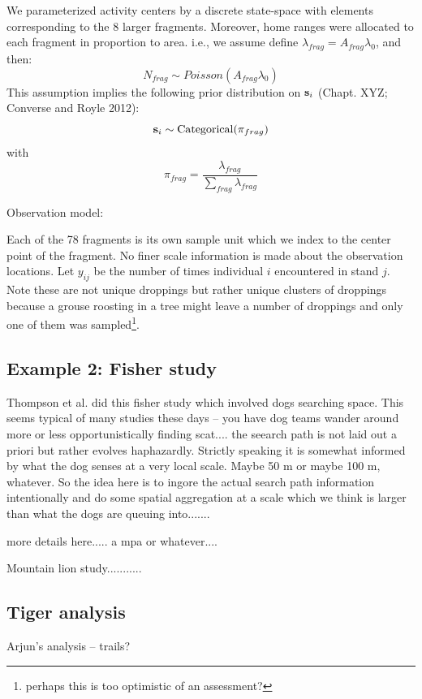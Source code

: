 We parameterized activity centers by a discrete state-space with elements
corresponding to the 8 larger fragments. Moreover, home ranges were allocated
to each fragment in  proportion to area. i.e., we assume
define $\lambda_{frag} = A_{frag} \lambda_{0}$, and then:
\[
 N_{frag} \sim Poisson( A_{frag} \lambda_{0} )
\]
This assumption implies the following prior distribution on ${\bf s}_{i}$ (Chapt.
XYZ; Converse and Royle 2012):
\[
{\bf s}_{i} \sim  \mbox{Categorical}(  \pi_{frag} )
\]
with
\[
 \pi_{frag} = \frac{ \lambda_{frag} }{\sum_{frag} \lambda_{frag}}
\]


Observation model:

Each of the 78 fragments is its own sample unit which we index to the
center point of the fragment. No finer scale information is made about
the observation locations.
Let $y_{ij}$ be  the number of times individual $i$ encountered in stand $j$.
Note these are not unique droppings but rather unique clusters of
droppings because a grouse roosting in a tree might leave a number of
droppings and only one of them was sampled\footnote{perhaps this is
  too optimistic of an assessment?}.



\subsection{Example 2: Fisher study}

Thompson et al. did this fisher study which involved dogs searching
space. This seems typical of many
studies these days -- you have dog teams wander around more or less
opportunistically finding scat.... the seearch path is not laid out a
priori but rather evolves haphazardly.  Strictly speaking it is
somewhat informed by what the dog senses at a very local scale. Maybe
50 m or maybe 100 m, whatever.
So the idea here is to ingore the actual search path information
intentionally and do some spatial aggregation at a scale which we
think is larger than what the dogs are queuing into.......

more details here..... a mpa or whatever....

Mountain lion study...........


\subsection{Tiger analysis}

Arjun's analysis -- trails?




